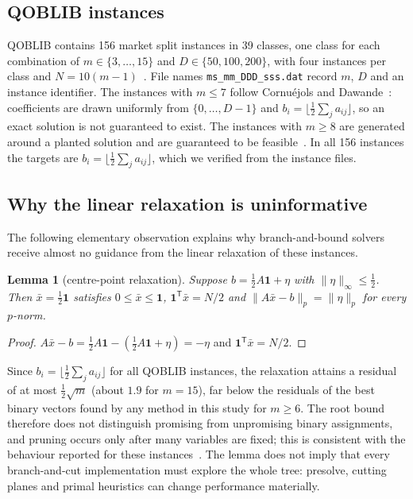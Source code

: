 \documentclass[pdflatex,sn-mathphys-num]{sn-jnl}
\theoremstyle{thmstyleone}
\newtheorem{lemma}{Lemma}
\theoremstyle{thmstylethree}
\begin{document}
\subsection{QOBLIB instances}\label{sec:instances}
QOBLIB contains 156 market split instances in 39 classes, one class for each combination of $m\in\{3,\dots,15\}$ and $D\in\{50,100,200\}$, with four instances per class and $N=10(m-1)$~\cite{koch2025}. File names \texttt{ms\_mm\_DDD\_sss.dat} record $m$, $D$ and an instance identifier. The instances with $m\le7$ follow Cornu\'ejols and Dawande~\cite{cornuejols1998}: coefficients are drawn uniformly from $\{0,\dots,D-1\}$ and $b_i=\lfloor\tfrac12\sum_j a_{ij}\rfloor$, so an exact solution is not guaranteed to exist. The instances with $m\ge8$ are generated around a planted solution and are guaranteed to be feasible~\cite{koch2025}. In all 156 instances the targets are $b_i=\lfloor\tfrac12\sum_j a_{ij}\rfloor$, which we verified from the instance files.

\subsection{Why the linear relaxation is uninformative}
The following elementary observation explains why branch-and-bound solvers receive almost no guidance from the linear relaxation of these instances.
\begin{lemma}[centre-point relaxation]\label{lem:collapse}
Suppose $b=\tfrac12A\mathbf 1+\eta$ with $\|\eta\|_\infty\le\tfrac12$. Then $\bar x=\tfrac12\mathbf 1$ satisfies $0\le\bar x\le\mathbf 1$, $\mathbf 1^{\mathsf T}\bar x=N/2$ and $\|A\bar x-b\|_p=\|\eta\|_p$ for every $p$-norm.
\end{lemma}
\begin{proof}
$A\bar x-b=\tfrac12A\mathbf 1-(\tfrac12A\mathbf 1+\eta)=-\eta$ and $\mathbf 1^{\mathsf T}\bar x=N/2$.
\end{proof}
Since $b_i=\lfloor\tfrac12\sum_j a_{ij}\rfloor$ for all QOBLIB instances, the relaxation attains a residual of at most $\tfrac12\sqrt m$ (about $1.9$ for $m=15$), far below the residuals of the best binary vectors found by any method in this study for $m\ge6$. The root bound therefore does not distinguish promising from unpromising binary assignments, and pruning occurs only after many variables are fixed; this is consistent with the behaviour reported for these instances~\cite{cornuejols1998,vogel2012,wassermann2026}. The lemma does not imply that every branch-and-cut implementation must explore the whole tree: presolve, cutting planes and primal heuristics can change performance materially.
\end{document}
